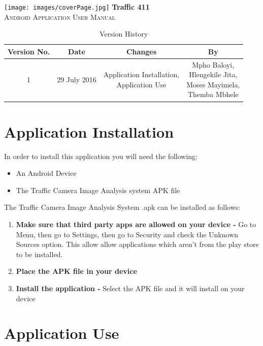 \documentclass[a4paper,12pt]{article}
\begin{document}
\newpage
\tableofcontents
\newpage
\texttt{[image: images/coverPage.jpg]}
\textbf{Traffic 411}\\
\textsc{\large Android Application User Manual}\\[0.5cm]
\newpage
\tableofcontents
\newpage

\newpage
\begin{table}[ht]
 \centering
 \caption{Version History}
 \label{tab:table1}
 \begin{tabular}{cccc}
   \toprule
    Version No. & Date & Changes & By\\
    \midrule
    1 & 29 July 2016 & \makecell{Application Installation, \\ Application Use} & \makecell{Mpho Baloyi,\\ Hlengekile Jita,\\ Moses Mayimela,\\ Themba Mbhele} \\
    \bottomrule
  \end{tabular}
\end{table}
\newpage

\section{Application Installation}
In order to install this application you will need the following:
\begin{itemize}
\item An Android Device
\item The Traffic Camera Image Analysis system APK file
\end{itemize}

The Traffic Camera Image Analysis System .apk can be installed as follows:
\begin{enumerate}
\item \textbf{Make sure that third party apps are allowed on your device -} Go to Menu, then go to Settings, then go to Security and check the Unknown Sources option. This allow allow applications which aren't from the play store to be installed.
\item \textbf{Place the APK file in your device} 
\item \textbf{Install the application -} Select the APK file and it will install on your device
\end{enumerate}

\section{Application Use}
\end{document}
